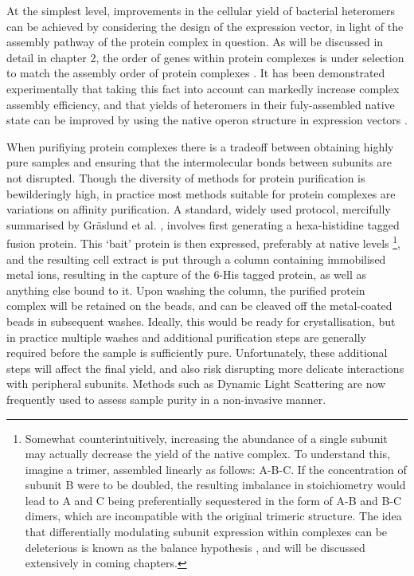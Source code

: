 \documentclass[a4paper,11pt,twoside,openright]{scrbook}
\begin{document}
At the simplest level, improvements in the cellular yield of bacterial heteromers can be achieved by considering the design of the expression vector, in light of the assembly pathway of the protein complex in question. As will be discussed in detail in chapter 2, the order of genes within protein complexes is under selection to match the assembly order of protein complexes \cite{Wells2016}. It has been demonstrated experimentally that taking this fact into account can markedly increase complex assembly efficiency, and that yields of heteromers in their fuly-assembled native state can be improved by using the native operon structure in expression vectors \cite{Shieh2015a, Poulsen2010}.

When purifiying protein complexes there is a tradeoff between obtaining highly pure samples and ensuring that the intermolecular bonds between subunits are not disrupted. Though the diversity of methods for protein purification is bewilderingly high, in practice most methods suitable for protein complexes are variations on affinity purification. A standard, widely used protocol, mercifully summarised by Gr{\"a}slund et al. \cite{Graslund2008}, involves first generating a hexa-histidine tagged fusion protein. This `bait' protein is then expressed, preferably at native levels
\footnote{Somewhat counterintuitively, increasing the abundance of a single subunit may actually decrease the yield of the native complex. To understand this, imagine a trimer, assembled linearly as follows: A-B-C. If the concentration of subunit B were to be doubled, the resulting imbalance in stoichiometry would lead to A and C being preferentially sequestered in the form of A-B and B-C dimers, which are incompatible with the original trimeric structure. The idea that differentially modulating subunit expression within complexes can be deleterious is known as the balance hypothesis \cite{Papp2003}, and will be discussed extensively in coming chapters.},
and the resulting cell extract is put through a column containing immobilised metal ions, resulting in the capture of the 6-His tagged protein, as well as anything else bound to it. Upon washing the column, the purified protein complex will be retained on the beads, and can be cleaved off the metal-coated beads in subsequent washes. Ideally, this would be ready for crystallisation, but in practice multiple washes and additional purification steps are generally required before the sample is sufficiently pure. Unfortunately, these additional steps will affect the final yield, and also risk disrupting more delicate interactions with peripheral subunits. Methods such as Dynamic Light Scattering are now frequently used to assess sample purity in a non-invasive manner.
\end{document}
